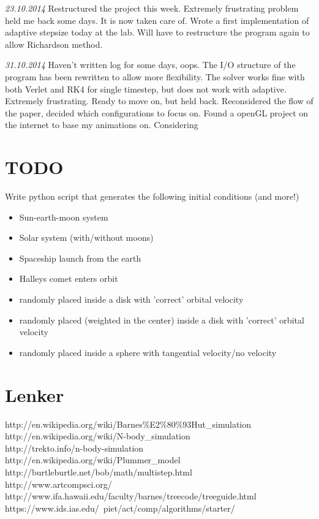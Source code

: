 \documentclass[11pt, oneside]{article}   	%
\begin{document}
\emph{23.10.2014}
Restructured the project this week. Extremely frustrating problem held me back some days. It is now taken care of. Wrote a first implementation of adaptive stepsize today at the lab. Will have to restructure the program again to allow Richardson method. 

\emph{31.10.2014}
Haven't written log for some days, oops. The I/O structure of the program has been rewritten to allow more flexibility. The solver works fine with both Verlet and RK4 for single timestep, but does not work with adaptive. Extremely frustrating. Ready to move on, but held back. Reconsidered the flow of the paper, decided which configurations to focus on. Found a openGL project on the internet to base my animations on. Considering 


\newpage

\section{TODO}


Write python script that generates the following initial conditions (and more!)
\begin{itemize}

\item Sun-earth-moon system
\item Solar system (with/without moons)
\item Spaceship launch from the earth
\item Halleys comet enters orbit

\item randomly placed inside a disk with 'correct' orbital velocity
\item randomly placed (weighted in the center) inside a disk with 'correct' orbital velocity
\item randomly placed inside a sphere with tangential velocity/no velocity

\end{itemize}

\newpage
\section{Lenker}
http://en.wikipedia.org/wiki/Barnes\%E2\%80\%93Hut\_simulation\\
http://en.wikipedia.org/wiki/N-body\_simulation\\
http://trekto.info/n-body-simulation\\
http://en.wikipedia.org/wiki/Plummer\_model\\
http://burtleburtle.net/bob/math/multistep.html\\
http://www.artcompsci.org/
http://www.ifa.hawaii.edu/faculty/barnes/treecode/treeguide.html\\
https://www.ids.ias.edu/~piet/act/comp/algorithms/starter/
\end{document}
